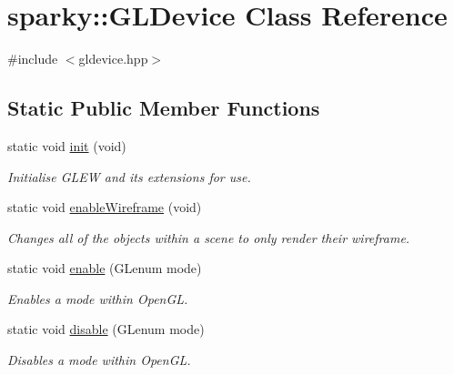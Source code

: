 \hypertarget{classsparky_1_1_g_l_device}{}\section{sparky\+:\+:G\+L\+Device Class Reference}
\label{classsparky_1_1_g_l_device}


{\ttfamily \#include $<$gldevice.\+hpp$>$}

\subsection*{Static Public Member Functions}
\begin{DoxyCompactItemize}
\item 
static void \hyperlink{classsparky_1_1_g_l_device_a36bbac5d135125b937e822ec3d2ed479}{init} (void)
\begin{DoxyCompactList}\small\item\em Initialise G\+L\+EW and its extensions for use. \end{DoxyCompactList}\item 
static void \hyperlink{classsparky_1_1_g_l_device_a246a77789e0cf62248ba5ee394ba4f37}{enable\+Wireframe} (void)\hypertarget{classsparky_1_1_g_l_device_a246a77789e0cf62248ba5ee394ba4f37}{}\label{classsparky_1_1_g_l_device_a246a77789e0cf62248ba5ee394ba4f37}

\begin{DoxyCompactList}\small\item\em Changes all of the objects within a scene to only render their wireframe. \end{DoxyCompactList}\item 
static void \hyperlink{classsparky_1_1_g_l_device_a9b688900d383d27a33e01ec1d3593c61}{enable} (G\+Lenum mode)\hypertarget{classsparky_1_1_g_l_device_a9b688900d383d27a33e01ec1d3593c61}{}\label{classsparky_1_1_g_l_device_a9b688900d383d27a33e01ec1d3593c61}

\begin{DoxyCompactList}\small\item\em Enables a mode within Open\+GL. \end{DoxyCompactList}\item 
static void \hyperlink{classsparky_1_1_g_l_device_a9ed7268568f88e16d2b3bb1c22c3614d}{disable} (G\+Lenum mode)\hypertarget{classsparky_1_1_g_l_device_a9ed7268568f88e16d2b3bb1c22c3614d}{}\label{classsparky_1_1_g_l_device_a9ed7268568f88e16d2b3bb1c22c3614d}

\begin{DoxyCompactList}\small\item\em Disables a mode within Open\+GL. \end{DoxyCompactList}\end{DoxyCompactItemize}


